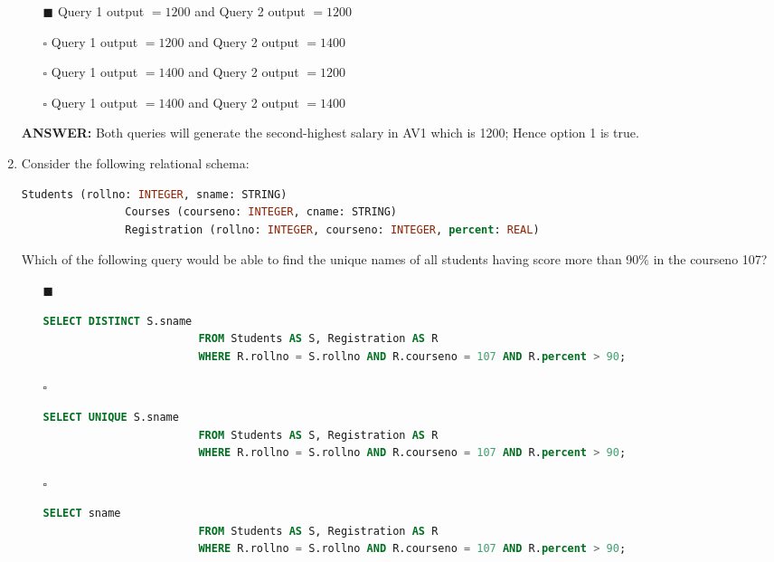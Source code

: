 \documentclass[10pt]{article}
\begin{document}
\begin{enumerate}
			\begin{enumerate}
				\item[$\blacksquare$] Query 1 output $= 1200$ and Query 2 output $= 1200$
				\item[$\square$] Query 1 output $= 1200$ and Query 2 output $= 1400$
				\item[$\square$] Query 1 output $= 1400$ and Query 2 output $= 1200$
				\item[$\square$] Query 1 output $= 1400$ and Query 2 output $= 1400$
			\end{enumerate}
			\color{red} \textbf{ANSWER:} \color{black} Both queries will generate the second-highest salary in AV1 which is 1200; Hence option 1 is true.

		\newpage

		\item Consider the following relational schema:
			\begin{lstlisting}[language=SQL,firstline=1, lastline=3] 
				Students (rollno: INTEGER, sname: STRING)
				Courses (courseno: INTEGER, cname: STRING)
				Registration (rollno: INTEGER, courseno: INTEGER, percent: REAL)
			\end{lstlisting}
			Which of the following query would be able to find the unique names of all students having score more than 90$\%$ in the courseno 107?
			\begin{enumerate}
				\item[$\blacksquare$] 
					\begin{lstlisting}[language=SQL,firstline=1, lastline=3, numbers = right] 
						SELECT DISTINCT S.sname 
						FROM Students AS S, Registration AS R 
						WHERE R.rollno = S.rollno AND R.courseno = 107 AND R.percent > 90;
					\end{lstlisting}
				
				\item[$\square$] 
					\begin{lstlisting}[language=SQL,firstline=1, lastline=3, numbers = right] 
						SELECT UNIQUE S.sname 
						FROM Students AS S, Registration AS R 
						WHERE R.rollno = S.rollno AND R.courseno = 107 AND R.percent > 90;
					\end{lstlisting}
				
				\item[$\square$] 
					\begin{lstlisting}[language=SQL,firstline=1, lastline=3, numbers = right] 
						SELECT sname 
						FROM Students AS S, Registration AS R 
						WHERE R.rollno = S.rollno AND R.courseno = 107 AND R.percent > 90;
					\end{lstlisting}
				

\end{enumerate}
\end{enumerate}
\end{document}
